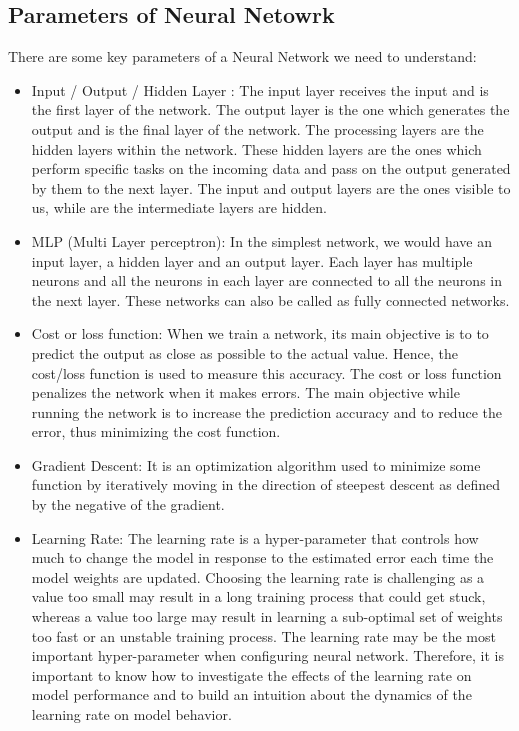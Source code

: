 \subsection{Parameters of Neural Netowrk}
There are some key parameters of a Neural Network we need to understand:
\begin{itemize}
    \item Input / Output / Hidden Layer : The input layer receives the input and is the first layer of the network. The output layer is the one which generates the output and is the final layer of the network. The processing layers are the hidden layers within the network. These hidden layers are the ones which perform specific tasks on the incoming data and pass on the output generated by them to the next layer. The input and output layers are the ones visible to us, while are the intermediate layers are hidden.
    \item MLP (Multi Layer perceptron): In the simplest network, we would have an input layer, a hidden layer and an output layer. Each layer has multiple neurons and all the neurons in each layer are connected to all the neurons in the next layer. These networks can also be called as fully connected networks.
    \item Cost or loss function: When we train a network, its main objective is to to predict the output as close as possible to the actual value. Hence, the cost/loss function is used to measure this accuracy. The cost or loss function penalizes the network when it makes errors. The main objective while running the network is to increase the prediction accuracy and to reduce the error, thus minimizing the cost function.
    \item Gradient Descent: It is an optimization algorithm used to minimize some function by iteratively moving in the direction of steepest descent as defined by the negative of the gradient.
    \item Learning Rate: The learning rate is a hyper-parameter that controls how much to change the model in response to the estimated error each time the model weights are updated. Choosing the learning rate is challenging as a value too small may result in a long training process that could get stuck, whereas a value too large may result in learning a sub-optimal set of weights too fast or an unstable training process. The learning rate may be the most important hyper-parameter when configuring neural network. Therefore, it is important to know how to investigate the effects of the learning rate on model performance and to build an intuition about the dynamics of the learning rate on model behavior.

\end{itemize}
